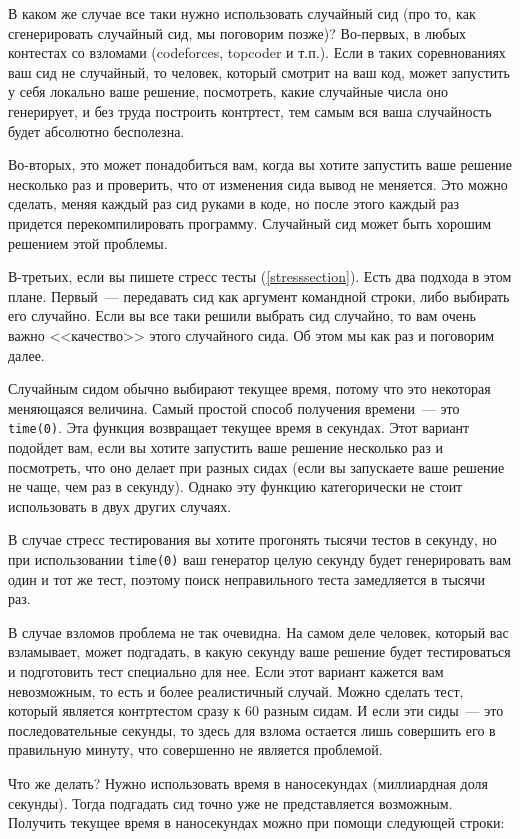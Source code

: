 В каком же случае все таки нужно использовать случайный сид (про то, как сгенерировать случайный сид, мы поговорим позже)? Во-первых, в любых контестах со взломами (codeforces, topcoder и т.п.). Если в таких соревнованиях ваш сид не случайный, то человек, который смотрит на ваш код, может запустить у себя локально ваше решение, посмотреть, какие случайные числа оно генерирует, и без труда построить контртест, тем самым вся ваша случайность будет абсолютно бесполезна.

Во-вторых, это может понадобиться вам, когда вы хотите запустить ваше решение несколько раз и проверить, что от изменения сида вывод не меняется. Это можно сделать, меняя каждый раз сид руками в коде, но после этого каждый раз придется перекомпилировать программу. Случайный сид может быть хорошим решением этой проблемы.

В-третьих, если вы пишете стресс тесты (\ref{stresssection}). Есть два подхода в этом плане. Первый~--- передавать сид как аргумент командной строки, либо выбирать его случайно. Если вы все таки решили выбрать сид случайно, то вам очень важно <<качество>> этого случайного сида. Об этом мы как раз и поговорим далее.

Случайным сидом обычно выбирают текущее время, потому что это некоторая меняющаяся величина. Самый простой способ получения времени~--- это \verb+time(0)+. Эта функция возвращает текущее время в секундах. Этот вариант подойдет вам, если вы хотите запустить ваше решение несколько раз и посмотреть, что оно делает при разных сидах (если вы запускаете ваше решение не чаще, чем раз в секунду). Однако эту функцию категорически не стоит использовать в двух других случаях.

В случае стресс тестирования вы хотите прогонять тысячи тестов в секунду, но при использовании \verb+time(0)+ ваш генератор целую секунду будет генерировать вам один и тот же тест, поэтому поиск неправильного теста замедляется в тысячи раз.

В случае взломов проблема не так очевидна. На самом деле человек, который вас взламывает, может подгадать, в какую секунду ваше решение будет тестироваться и подготовить тест специально для нее. Если этот вариант кажется вам невозможным, то есть и более реалистичный случай. Можно сделать тест, который является контртестом сразу к $60$ разным сидам. И если эти сиды~--- это последовательные секунды, то здесь для взлома остается лишь совершить его в правильную минуту, что совершенно не является проблемой.

Что же делать? Нужно использовать время в наносекундах (миллиардная доля секунды). Тогда подгадать сид точно уже не представляется возможным. Получить текущее время в наносекундах можно при помощи следующей строки:

